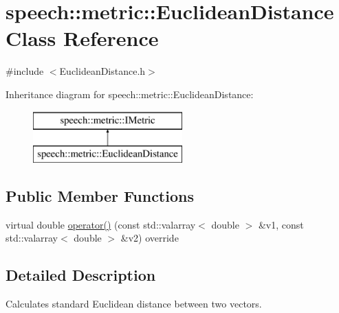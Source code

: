 \hypertarget{classspeech_1_1metric_1_1EuclideanDistance}{\section{speech\+:\+:metric\+:\+:Euclidean\+Distance Class Reference}
\label{classspeech_1_1metric_1_1EuclideanDistance}
}


{\ttfamily \#include $<$Euclidean\+Distance.\+h$>$}

Inheritance diagram for speech\+:\+:metric\+:\+:Euclidean\+Distance\+:\begin{figure}[H]
\begin{center}
\leavevmode
\includegraphics[height=2.000000cm]{classspeech_1_1metric_1_1EuclideanDistance}
\end{center}
\end{figure}
\subsection*{Public Member Functions}
\begin{DoxyCompactItemize}
\item 
virtual double \hyperlink{classspeech_1_1metric_1_1EuclideanDistance_abd0d73ebf83dc218ab8f6ab5dee47064}{operator()} (const std\+::valarray$<$ double $>$ \&v1, const std\+::valarray$<$ double $>$ \&v2) override
\end{DoxyCompactItemize}


\subsection{Detailed Description}
Calculates standard Euclidean distance between two vectors. 

